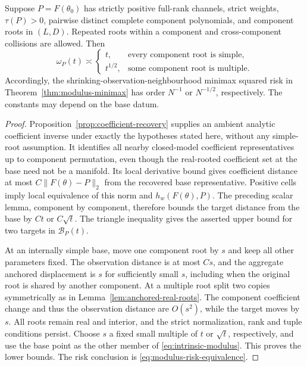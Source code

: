 \begin{theorem}
\label{thm:anchored-multiplicity}
Suppose $P=F(\theta_0)$ has strictly positive full-rank channels, strict
weights, $\tau(P)>0$, pairwise distinct complete component polynomials,
and component roots in $(L,D)$. Repeated roots within a component and
cross-component collisions are allowed. Then
\begin{equation}\label{eq:anchored-exponents}
 \omega_P(t)\asymp
 \begin{cases}
 t,&\text{every component root is simple},\\
 t^{1/2},&\text{some component root is multiple}.
 \end{cases}
\end{equation}
Accordingly, the shrinking-observation-neighbourhood minimax squared
risk in Theorem~\ref{thm:modulus-minimax} has order $N^{-1}$ or
$N^{-1/2}$, respectively. The constants may depend on the base datum.
\end{theorem}
\begin{proof}
Proposition~\ref{prop:coefficient-recovery} supplies an ambient analytic
coefficient inverse under exactly the hypotheses stated here, without
any simple-root assumption. It identifies all nearby closed-model
coefficient representatives up to component permutation, even though
the real-rooted coefficient set at the base need not be a manifold.
Its local derivative bound gives coefficient distance at most
$C\|F(\theta)-P\|_2$ from the recovered base representative. Positive cells imply local equivalence of this
norm and $h_w(F(\theta),P)$. The preceding scalar lemma, component by
component, therefore bounds the target distance from the base by
$Ct$ or $C\sqrt t$. The triangle inequality gives the asserted upper
bound for two targets in $\mathcal B_P(t)$.

At an internally simple base, move one component root by $s$ and keep
all other parameters fixed. The observation distance is at most $Cs$,
and the aggregate anchored displacement is $s$ for sufficiently small
$s$, including when the original root is shared by another component.
At a multiple root split two copies symmetrically as in
Lemma~\ref{lem:anchored-real-roots}. The component coefficient change
and thus the observation distance are $O(s^2)$, while the target
moves by $s$. All roots remain real and interior, and the strict
normalization, rank and tuple conditions persist. Choose $s$ a fixed
small multiple of $t$ or $\sqrt t$, respectively, and use the base
point as the other member of \eqref{eq:intrinsic-modulus}. This proves
the lower bounds. The risk conclusion is
\eqref{eq:modulus-risk-equivalence}.
\end{proof}

